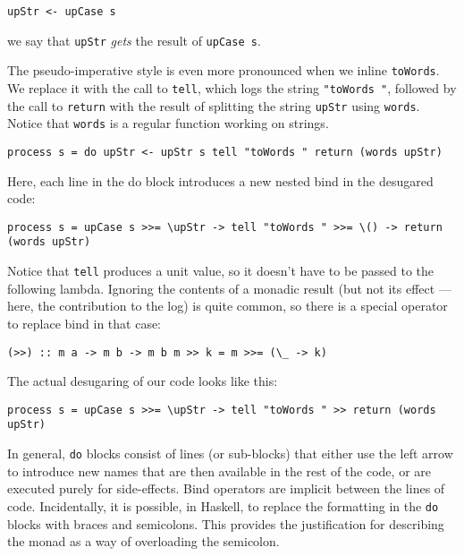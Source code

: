 \begin{verbatim}
upStr <- upCase s
\end{verbatim}

we say that \texttt{upStr} \emph{gets} the result of \texttt{upCase\ s}.

The pseudo-imperative style is even more pronounced when we inline
\texttt{toWords}. We replace it with the call to \texttt{tell}, which
logs the string \texttt{"toWords\ "}, followed by the call to
\texttt{return} with the result of splitting the string \texttt{upStr}
using \texttt{words}. Notice that \texttt{words} is a regular function
working on strings.

\begin{verbatim}
process s = do upStr <- upStr s tell "toWords " return (words upStr)
\end{verbatim}

Here, each line in the do block introduces a new nested bind in the
desugared code:

\begin{verbatim}
process s = upCase s >>= \upStr -> tell "toWords " >>= \() -> return (words upStr)
\end{verbatim}

Notice that \texttt{tell} produces a unit value, so it doesn't have to
be passed to the following lambda. Ignoring the contents of a monadic
result (but not its effect --- here, the contribution to the log) is
quite common, so there is a special operator to replace bind in that
case:

\begin{verbatim}
(>>) :: m a -> m b -> m b m >> k = m >>= (\_ -> k)
\end{verbatim}

The actual desugaring of our code looks like this:

\begin{verbatim}
process s = upCase s >>= \upStr -> tell "toWords " >> return (words upStr)
\end{verbatim}

In general, \texttt{do} blocks consist of lines (or sub-blocks) that
either use the left arrow to introduce new names that are then available
in the rest of the code, or are executed purely for side-effects. Bind
operators are implicit between the lines of code. Incidentally, it is
possible, in Haskell, to replace the formatting in the \texttt{do}
blocks with braces and semicolons. This provides the justification for
describing the monad as a way of overloading the semicolon.

